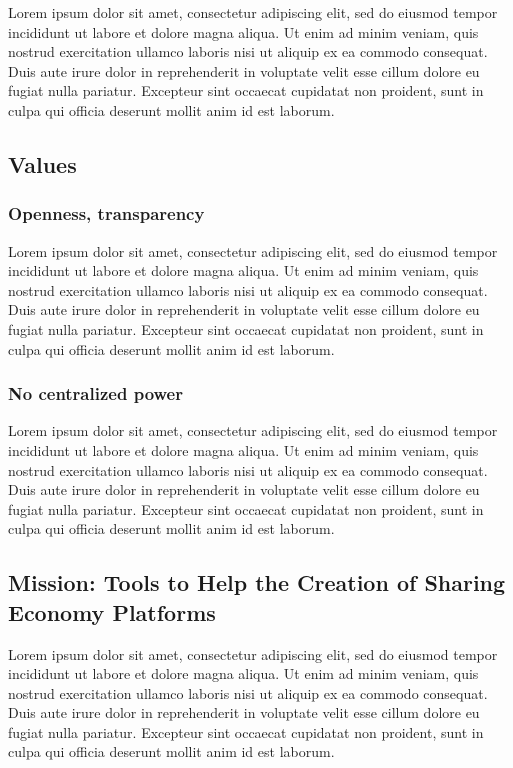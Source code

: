 \documentclass[a4paper]{article}
\begin{document}
Lorem ipsum dolor sit amet, consectetur adipiscing elit, sed do eiusmod tempor incididunt ut labore et dolore magna aliqua. Ut enim ad minim veniam, quis nostrud exercitation ullamco laboris nisi ut aliquip ex ea commodo consequat. Duis aute irure dolor in reprehenderit in voluptate velit esse cillum dolore eu fugiat nulla pariatur. Excepteur sint occaecat cupidatat non proident, sunt in culpa qui officia deserunt mollit anim id est laborum.

\subsection{Values}

\subsubsection{Openness, transparency}

Lorem ipsum dolor sit amet, consectetur adipiscing elit, sed do eiusmod tempor incididunt ut labore et dolore magna aliqua. Ut enim ad minim veniam, quis nostrud exercitation ullamco laboris nisi ut aliquip ex ea commodo consequat. Duis aute irure dolor in reprehenderit in voluptate velit esse cillum dolore eu fugiat nulla pariatur. Excepteur sint occaecat cupidatat non proident, sunt in culpa qui officia deserunt mollit anim id est laborum.

\subsubsection{No centralized power}

Lorem ipsum dolor sit amet, consectetur adipiscing elit, sed do eiusmod tempor incididunt ut labore et dolore magna aliqua. Ut enim ad minim veniam, quis nostrud exercitation ullamco laboris nisi ut aliquip ex ea commodo consequat. Duis aute irure dolor in reprehenderit in voluptate velit esse cillum dolore eu fugiat nulla pariatur. Excepteur sint occaecat cupidatat non proident, sunt in culpa qui officia deserunt mollit anim id est laborum.

\subsection{Mission: Tools to Help the Creation of Sharing Economy Platforms}

Lorem ipsum dolor sit amet, consectetur adipiscing elit, sed do eiusmod tempor incididunt ut labore et dolore magna aliqua. Ut enim ad minim veniam, quis nostrud exercitation ullamco laboris nisi ut aliquip ex ea commodo consequat. Duis aute irure dolor in reprehenderit in voluptate velit esse cillum dolore eu fugiat nulla pariatur. Excepteur sint occaecat cupidatat non proident, sunt in culpa qui officia deserunt mollit anim id est laborum.
\end{document}

